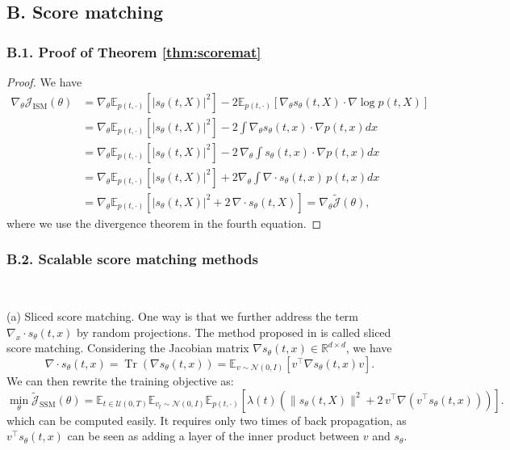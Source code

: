 \documentclass[letterpaper,11pt,reqno]{amsart}
\numberwithin{equation}{section}
\begin{document}
\subsection*{B. Score matching}

\subsubsection*{B.1. Proof of Theorem \ref{thm:scoremat}}
\begin{proof}
We have 
\begin{equation*}
\begin{aligned}
\nabla_\theta \mathcal{J}_{\text{ISM}}(\theta) 
& = \nabla_\theta \mathbb{E}_{p(t, \cdot)} \left[|s_\theta(t,X)|^2\right] - 2 \mathbb{E}_{p(t, \cdot)} \left[\nabla_\theta s_\theta(t,X) \cdot \nabla \log p(t,X)\right] \\
& =  \nabla_\theta \mathbb{E}_{p(t, \cdot)} \left[|s_\theta(t,X)|^2\right]  - 2 \int \nabla_\theta s_\theta(t,x) \cdot \nabla p(t,x) dx \\
& =\nabla_\theta \mathbb{E}_{p(t, \cdot)} \left[|s_\theta(t,X)|^2\right]  - 2 \, \nabla_\theta \int  s_\theta(t,x) \cdot \nabla p(t,x) dx  \\ 
& = \nabla_\theta \mathbb{E}_{p(t, \cdot)} \left[|s_\theta(t,X)|^2\right] + 2 \nabla_\theta \int \nabla \cdot s_\theta(t,x) \, p(t,x) dx \\
& = \nabla_\theta \mathbb{E}_{p(t, \cdot)}\left[ |s_\theta(t,X)|^2 + 2\, \nabla \cdot s_\theta(t,X) \right] = \nabla_\theta \widetilde{\mathcal{J}}(\theta),
\end{aligned}
\end{equation*}
where we use the divergence theorem in the fourth equation. 
\end{proof}

\subsubsection*{B.2. Scalable score matching methods}
$~$ 

\smallskip
(a) Sliced score matching. 
One way is that we further address the term $\nabla_x\cdot s_{\theta}(t,x)$ by random projections. The method proposed in \cite{Song20sl} is called sliced score matching. 
Considering the Jacobian matrix $\nabla s_{\theta}(t,x)\in\mathbb{R}^{d \times d}$, 
we have
$$
\nabla \cdot s_{\theta}(t,x)=\operatorname{Tr}(\nabla s_{\theta}(t,x))=\mathbb{E}_{v\sim \mathcal{N}(0,I)}\left[v^{\top}\nabla s_{\theta}(t,x)v\right].
$$
We can then rewrite the training objective as:
\begin{equation}
\label{eq:equivscorematb_slicedSM}
\min_\theta \widetilde{\mathcal{J}}_{\text{SSM}}(\theta) = \mathbb{E}_{t \in \mathcal{U}(0, T)}\mathbb{E}_{v_t\sim \mathcal{N}(0,I)}\mathbb{E}_{p(t, \cdot)} \left[\lambda(t)\left(\|s_\theta(t,X)\|^2  + 2 \, v^{\top}\nabla (v^{\top}s_{\theta}(t,x))\right)\right].
\end{equation}
which can be computed easily. 
It requires only two times of back propagation, as $v^{\top}s_{\theta}(t,x)$ can be seen as adding a layer of the inner product between $v$ and $s_{\theta}$.
\end{document}
